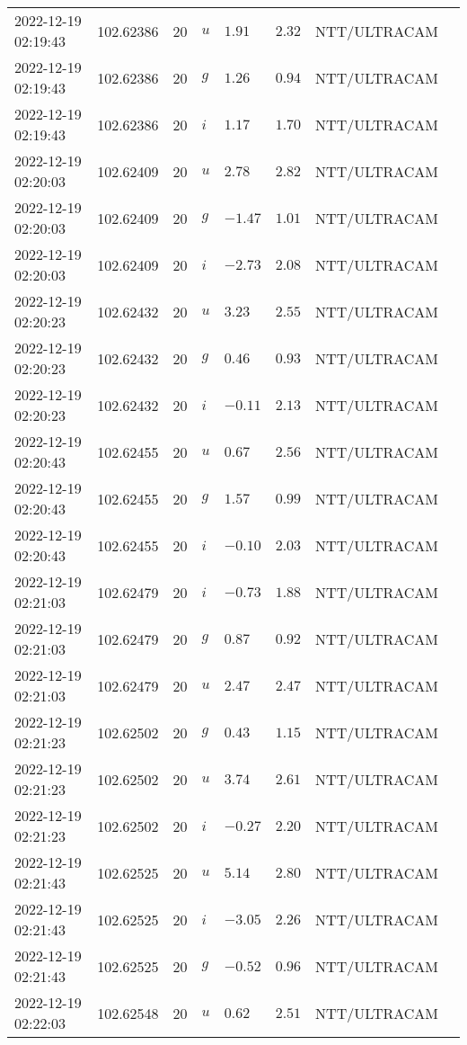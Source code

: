 \documentclass{nature_plusfigure}
\begin{document}
\begin{supplement}
\begin{center}
\begin{longtable}{llllllll}
2022-12-19 02:19:43 & 102.62386 & 20 & $u$ & $1.91$ & $2.32$ & NTT/ULTRACAM &  \\ 
2022-12-19 02:19:43 & 102.62386 & 20 & $g$ & $1.26$ & $0.94$ & NTT/ULTRACAM &  \\ 
2022-12-19 02:19:43 & 102.62386 & 20 & $i$ & $1.17$ & $1.70$ & NTT/ULTRACAM &  \\ 
2022-12-19 02:20:03 & 102.62409 & 20 & $u$ & $2.78$ & $2.82$ & NTT/ULTRACAM &  \\ 
2022-12-19 02:20:03 & 102.62409 & 20 & $g$ & $-1.47$ & $1.01$ & NTT/ULTRACAM &  \\ 
2022-12-19 02:20:03 & 102.62409 & 20 & $i$ & $-2.73$ & $2.08$ & NTT/ULTRACAM &  \\ 
2022-12-19 02:20:23 & 102.62432 & 20 & $u$ & $3.23$ & $2.55$ & NTT/ULTRACAM &  \\ 
2022-12-19 02:20:23 & 102.62432 & 20 & $g$ & $0.46$ & $0.93$ & NTT/ULTRACAM &  \\ 
2022-12-19 02:20:23 & 102.62432 & 20 & $i$ & $-0.11$ & $2.13$ & NTT/ULTRACAM &  \\ 
2022-12-19 02:20:43 & 102.62455 & 20 & $u$ & $0.67$ & $2.56$ & NTT/ULTRACAM &  \\ 
2022-12-19 02:20:43 & 102.62455 & 20 & $g$ & $1.57$ & $0.99$ & NTT/ULTRACAM &  \\ 
2022-12-19 02:20:43 & 102.62455 & 20 & $i$ & $-0.10$ & $2.03$ & NTT/ULTRACAM &  \\ 
2022-12-19 02:21:03 & 102.62479 & 20 & $i$ & $-0.73$ & $1.88$ & NTT/ULTRACAM &  \\ 
2022-12-19 02:21:03 & 102.62479 & 20 & $g$ & $0.87$ & $0.92$ & NTT/ULTRACAM &  \\ 
2022-12-19 02:21:03 & 102.62479 & 20 & $u$ & $2.47$ & $2.47$ & NTT/ULTRACAM &  \\ 
2022-12-19 02:21:23 & 102.62502 & 20 & $g$ & $0.43$ & $1.15$ & NTT/ULTRACAM &  \\ 
2022-12-19 02:21:23 & 102.62502 & 20 & $u$ & $3.74$ & $2.61$ & NTT/ULTRACAM &  \\ 
2022-12-19 02:21:23 & 102.62502 & 20 & $i$ & $-0.27$ & $2.20$ & NTT/ULTRACAM &  \\ 
2022-12-19 02:21:43 & 102.62525 & 20 & $u$ & $5.14$ & $2.80$ & NTT/ULTRACAM &  \\ 
2022-12-19 02:21:43 & 102.62525 & 20 & $i$ & $-3.05$ & $2.26$ & NTT/ULTRACAM &  \\ 
2022-12-19 02:21:43 & 102.62525 & 20 & $g$ & $-0.52$ & $0.96$ & NTT/ULTRACAM &  \\ 
2022-12-19 02:22:03 & 102.62548 & 20 & $u$ & $0.62$ & $2.51$ & NTT/ULTRACAM &  \\ 

\end{longtable}
\end{center}
\end{supplement}
\end{document}
